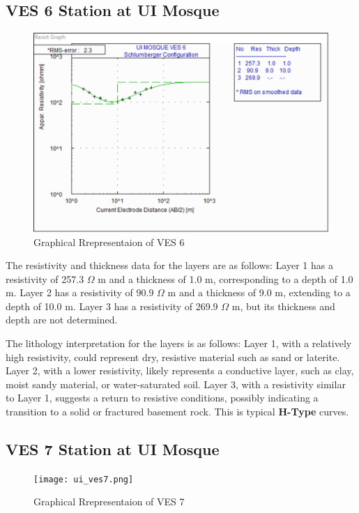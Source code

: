 \documentclass[12pt,a4paper]{report}
\begin{document}
\subsection{VES 6 Station at UI Mosque}

\begin{figure}[H]
    \centering
    \includegraphics[width=1.0\textwidth]{ui_ves6.png}
    \caption{Graphical Rrepresentaion of VES 6}
    \label{fig:VES_6_Curve}
\end{figure}

The resistivity and thickness data for the layers are as follows: Layer 1 has a resistivity of 257.3 $\Omega$ m and a thickness of 1.0 m, corresponding to a depth of 1.0 m. Layer 2 has a resistivity of 90.9 $\Omega$ m and a thickness of 9.0 m, extending to a depth of 10.0 m. Layer 3 has a resistivity of 269.9 $\Omega$ m, but its thickness and depth are not determined.

The lithology interpretation for the layers is as follows: Layer 1, with a relatively high resistivity, could represent dry, resistive material such as sand or laterite. Layer 2, with a lower resistivity, likely represents a conductive layer, such as clay, moist sandy material, or water-saturated soil. Layer 3, with a resistivity similar to Layer 1, suggests a return to resistive conditions, possibly indicating a transition to a solid or fractured basement rock. This is typical \textbf{H-Type} curves.

\subsection{VES 7 Station at UI Mosque}

\begin{figure}[H]
    \centering
    \texttt{[image: ui\_ves7.png]}
    \caption{Graphical Rrepresentaion of VES 7}
    \label{fig:VES_7_Curve}
\end{figure}
\end{document}
